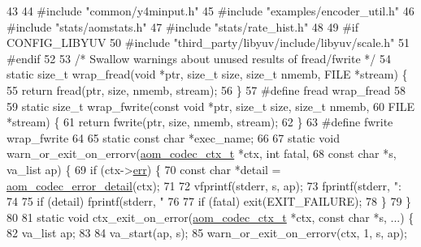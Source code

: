 \begin{DoxyCodeInclude}
43 
44 \textcolor{preprocessor}{#include "common/y4minput.h"}
45 \textcolor{preprocessor}{#include "examples/encoder\_util.h"}
46 \textcolor{preprocessor}{#include "stats/aomstats.h"}
47 \textcolor{preprocessor}{#include "stats/rate\_hist.h"}
48 
49 \textcolor{preprocessor}{#if CONFIG\_LIBYUV}
50 \textcolor{preprocessor}{#include "third\_party/libyuv/include/libyuv/scale.h"}
51 \textcolor{preprocessor}{#endif}
52 
53 \textcolor{comment}{/* Swallow warnings about unused results of fread/fwrite */}
54 \textcolor{keyword}{static} \textcolor{keywordtype}{size\_t} wrap\_fread(\textcolor{keywordtype}{void} *ptr, \textcolor{keywordtype}{size\_t} size, \textcolor{keywordtype}{size\_t} nmemb, FILE *stream) \{
55   \textcolor{keywordflow}{return} fread(ptr, size, nmemb, stream);
56 \}
57 \textcolor{preprocessor}{#define fread wrap\_fread}
58 
59 \textcolor{keyword}{static} \textcolor{keywordtype}{size\_t} wrap\_fwrite(\textcolor{keyword}{const} \textcolor{keywordtype}{void} *ptr, \textcolor{keywordtype}{size\_t} size, \textcolor{keywordtype}{size\_t} nmemb,
60                           FILE *stream) \{
61   \textcolor{keywordflow}{return} fwrite(ptr, size, nmemb, stream);
62 \}
63 \textcolor{preprocessor}{#define fwrite wrap\_fwrite}
64 
65 \textcolor{keyword}{static} \textcolor{keyword}{const} \textcolor{keywordtype}{char} *exec\_name;
66 
67 \textcolor{keyword}{static} \textcolor{keywordtype}{void} warn\_or\_exit\_on\_errorv(\hyperlink{structaom__codec__ctx}{aom\_codec\_ctx\_t} *ctx, \textcolor{keywordtype}{int} fatal,
68                                    \textcolor{keyword}{const} \textcolor{keywordtype}{char} *s, va\_list ap) \{
69   \textcolor{keywordflow}{if} (ctx->\hyperlink{structaom__codec__ctx_a4cf9c265a7c34e92bb02d04aa3cab718}{err}) \{
70     \textcolor{keyword}{const} \textcolor{keywordtype}{char} *detail = \hyperlink{group__codec_ga43a70562598b485685794a4e9d9d53f7}{aom\_codec\_error\_detail}(ctx);
71 
72     vfprintf(stderr, s, ap);
73     fprintf(stderr, \textcolor{stringliteral}{": %
74 
75     \textcolor{keywordflow}{if} (detail) fprintf(stderr, \textcolor{stringliteral}{"    %
76 
77     \textcolor{keywordflow}{if} (fatal) exit(EXIT\_FAILURE);
78   \}
79 \}
80 
81 \textcolor{keyword}{static} \textcolor{keywordtype}{void} ctx\_exit\_on\_error(\hyperlink{structaom__codec__ctx}{aom\_codec\_ctx\_t} *ctx, \textcolor{keyword}{const} \textcolor{keywordtype}{char} *s, ...) \{
82   va\_list ap;
83 
84   va\_start(ap, s);
85   warn\_or\_exit\_on\_errorv(ctx, 1, s, ap);
}}
\end{DoxyCodeInclude}
